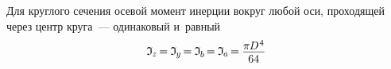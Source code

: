 \documentclass[14pt]{extarticle}
\begin{document}
Для круглого сечения осевой момент инерции вокруг любой оси, проходящей через центр круга~--- одинаковый и~равный
\[
\mathfrak{I}_{\hspace{-0.1ex}\scalebox{.8}{$z$}} \hspace{-0.25ex}=\hspace{-0.1ex}
\mathfrak{I}_{\hspace{-0.1ex}\scalebox{.8}{$y$}} \hspace{-0.25ex}=\hspace{-0.1ex}
\mathfrak{I}_{\hspace{-0.1ex}\scalebox{.8}{$b$}} \hspace{-0.25ex}=\hspace{-0.1ex}
\mathfrak{I}_{\hspace{-0.1ex}\scalebox{.8}{$a$}} \hspace{-0.25ex}=\hspace{-0.1ex}
\displaystyle\frac{\raisebox{-0.18em}{$\pi \hspace{-0.1ex} D^{\hspace{.1ex}4}$}}{64}
\]
\end{document}
